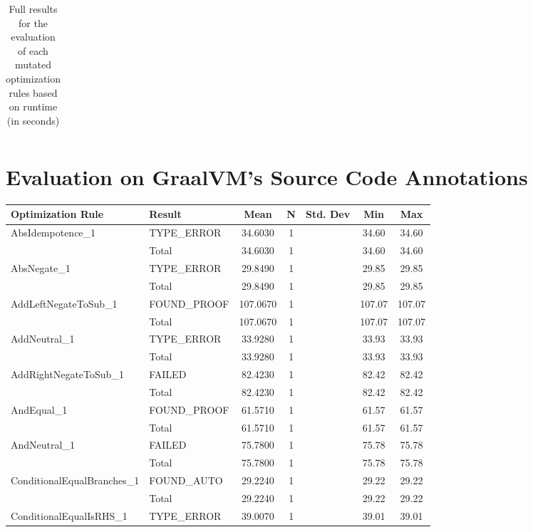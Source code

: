 \begin{appendices}
\begin{longtable}{L{0.25\textwidth} L{0.2\textwidth}  c  c  c  c  c }
    \caption{Full results for the evaluation of each mutated optimization rules based on runtime (in seconds)} %
    \label{tab:fullEvaluationMutated}
\end{longtable}

\chapter{Evaluation on GraalVM's Source Code Annotations}

\begin{longtable}{L{0.25\textwidth} L{0.2\textwidth}  c  c  c  c  c } 
    \toprule
    Optimization Rule & Result & Mean & N & Std. Dev & Min & Max \\ \midrule 
    AbsIdempotence\_1 & TYPE\_ERROR & 34.6030 & 1 &  & 34.60 & 34.60 \\ \midrule 
    & Total & 34.6030 & 1 &  & 34.60 & 34.60 \\ \midrule 
    AbsNegate\_1 & TYPE\_ERROR & 29.8490 & 1 &  & 29.85 & 29.85 \\ \midrule 
    & Total & 29.8490 & 1 &  & 29.85 & 29.85 \\ \midrule 
    AddLeftNegateToSub\_1 & FOUND\_PROOF & 107.0670 & 1 &  & 107.07 & 107.07 \\ \midrule 
    & Total & 107.0670 & 1 &  & 107.07 & 107.07 \\ \midrule 
    AddNeutral\_1 & TYPE\_ERROR & 33.9280 & 1 &  & 33.93 & 33.93 \\ \midrule 
    & Total & 33.9280 & 1 &  & 33.93 & 33.93 \\ \midrule 
    AddRightNegateToSub\_1 & FAILED & 82.4230 & 1 &  & 82.42 & 82.42 \\ \midrule 
    & Total & 82.4230 & 1 &  & 82.42 & 82.42 \\ \midrule 
    AndEqual\_1 & FOUND\_PROOF & 61.5710 & 1 &  & 61.57 & 61.57 \\ \midrule 
    & Total & 61.5710 & 1 &  & 61.57 & 61.57 \\ \midrule 
    AndNeutral\_1 & FAILED & 75.7800 & 1 &  & 75.78 & 75.78 \\ \midrule 
    & Total & 75.7800 & 1 &  & 75.78 & 75.78 \\ \midrule 
    ConditionalEqualBranches\_1 & FOUND\_AUTO & 29.2240 & 1 &  & 29.22 & 29.22 \\ \midrule 
    & Total & 29.2240 & 1 &  & 29.22 & 29.22 \\ \midrule 
    ConditionalEqualIsRHS\_1 & TYPE\_ERROR & 39.0070 & 1 &  & 39.01 & 39.01 \\ \midrule 

\end{longtable}
\end{appendices}
